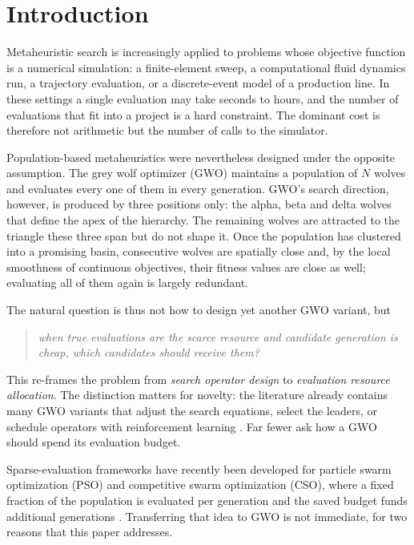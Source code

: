\section{Introduction}

Metaheuristic search is increasingly applied to problems whose objective
function is a numerical simulation: a finite-element sweep, a computational
fluid dynamics run, a trajectory evaluation, or a discrete-event model of a
production line. In these settings a single evaluation may take seconds to
hours, and the number of evaluations that fit into a project is a hard
constraint. The dominant cost is therefore not arithmetic but the number of
calls to the simulator.

Population-based metaheuristics were nevertheless designed under the opposite
assumption. The grey wolf optimizer (GWO) \cite{mirjalili2014gwo} maintains a
population of $N$ wolves and evaluates every one of them in every generation.
GWO's search direction, however, is produced by three positions only: the alpha,
beta and delta wolves that define the apex of the hierarchy. The remaining
wolves are attracted to the triangle these three span but do not shape it. Once
the population has clustered into a promising basin, consecutive wolves are
spatially close and, by the local smoothness of continuous objectives, their
fitness values are close as well; evaluating all of them again is largely
redundant.

The natural question is thus not how to design yet another GWO variant, but

\begin{quote}
\emph{when true evaluations are the scarce resource and candidate generation is
cheap, which candidates should receive them?}
\end{quote}

This re-frames the problem from \emph{search operator design} to
\emph{evaluation resource allocation}. The distinction matters for novelty: the
literature already contains many GWO variants that adjust the search equations,
select the leaders, or schedule operators with reinforcement learning
\cite{...}. Far fewer ask how a GWO should spend its evaluation budget.

Sparse-evaluation frameworks have recently been developed for particle swarm
optimization (PSO) and competitive swarm optimization (CSO), where a fixed
fraction of the population is evaluated per generation and the saved budget
funds additional generations \cite{ssl-pso,ss-rlpso,saq-cso}. Transferring that
idea to GWO is not immediate, for two reasons that this paper addresses.

